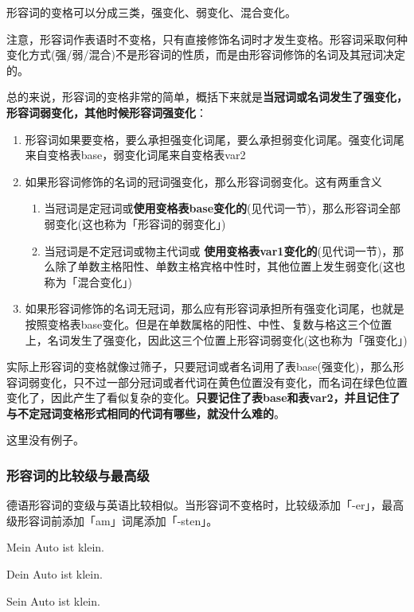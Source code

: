 形容词的变格可以分成三类，强变化、弱变化、混合变化。

注意，形容词作表语时不变格，只有直接修饰名词时才发生变格。形容词采取何种变化方式(强/弱/混合)不是形容词的性质，而是由形容词修饰的名词及其冠词决定的。

总的来说，形容词的变格非常的简单，概括下来就是{\bf 当冠词或名词发生了强变化，形容词弱变化，其他时候形容词强变化}：

\begin{enumerate}[leftmargin=3.5em, topsep=0pt, itemsep=0pt, parsep=0pt]
    \item 形容词如果要变格，要么承担强变化词尾，要么承担弱变化词尾。强变化词尾来自变格表base，弱变化词尾来自变格表var2
    \item 如果形容词修饰的名词的冠词强变化，那么形容词弱变化。这有两重含义
    \begin{enumerate}
        \item 当冠词是定冠词或{\bf 使用变格表base变化的}(见代词一节)，那么形容词全部弱变化(这也称为「形容词的弱变化」)
        \item 当冠词是不定冠词或物主代词或 {\bf 使用变格表var1变化的}(见代词一节)，那么除了单数主格阳性、单数主格宾格中性时，其他位置上发生弱变化(这也称为「混合变化」)
    \end{enumerate}
    \item 如果形容词修饰的名词无冠词，那么应有形容词承担所有强变化词尾，也就是按照变格表base变化。但是在单数属格的阳性、中性、复数与格这三个位置上，名词发生了强变化，因此这三个位置上形容词弱变化(这也称为「强变化」)
\end{enumerate}

实际上形容词的变格就像过筛子，只要冠词或者名词用了表base(强变化)，那么形容词弱变化，只不过一部分冠词或者代词在黄色位置没有变化，而名词在绿色位置变化了，因此产生了看似复杂的变化。{\bf 只要记住了表base和表var2，并且记住了与不定冠词变格形式相同的代词有哪些，就没什么难的}。

这里没有例子。

\subsubsection{形容词的比较级与最高级}

德语形容词的变级与英语比较相似。当形容词不变格时，比较级添加「-er」，最高级形容词前添加「am」词尾添加「-sten」。

Mein Auto ist klein.

Dein Auto ist klein.

Sein Auto ist  klein.

